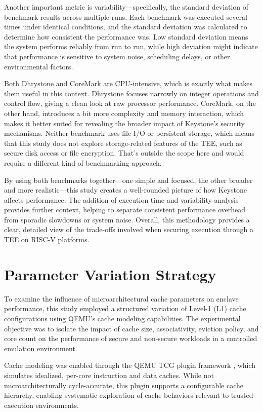 Another important metric is variability—specifically, the standard deviation of benchmark results across multiple runs. Each benchmark was executed several times under identical conditions, and the standard deviation was calculated to determine how consistent the performance was. Low standard deviation means the system performs reliably from run to run, while high deviation might indicate that performance is sensitive to system noise, scheduling delays, or other environmental factors.

Both Dhrystone\cite{weiss2002dhrystone} and CoreMark\cite{gal2012exploring} are CPU-intensive, which is exactly what makes them useful in this context. Dhrystone focuses narrowly on integer operations and control flow, giving a clean look at raw processor performance. CoreMark, on the other hand, introduces a bit more complexity and memory interaction, which makes it better suited for revealing the broader impact of Keystone’s security mechanisms. Neither benchmark uses file I/O or persistent storage, which means that this study does not explore storage-related features of the TEE, such as secure disk access or file encryption. That’s outside the scope here and would require a different kind of benchmarking approach.

By using both benchmarks together—one simple and focused, the other broader and more realistic—this study creates a well-rounded picture of how Keystone affects performance. The addition of execution time and variability analysis provides further context, helping to separate consistent performance overhead from sporadic slowdowns or system noise. Overall, this methodology provides a clear, detailed view of the trade-offs involved when securing execution through a TEE on RISC-V platforms.

\section{Parameter Variation Strategy}
\label{sec:param-variation}

To examine the influence of microarchitectural cache parameters on enclave performance, this study employed a structured variation of Level-1 (L1) cache configurations using QEMU's cache modeling capabilities. The experimental objective was to isolate the impact of cache size, associativity, eviction policy, and core count on the performance of secure and non-secure workloads in a controlled emulation environment.

Cache modeling was enabled through the QEMU TCG plugin framework \cite{mandour2021cache}, which simulates idealized, per-core instruction and data caches. While not microarchitecturally cycle-accurate, this plugin supports a configurable cache hierarchy, enabling systematic exploration of cache behaviors relevant to trusted execution environments.

